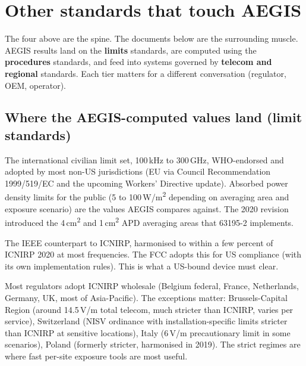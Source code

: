 \documentclass[11pt,a4paper]{article}
\begin{document}
\section{Other standards that touch AEGIS}
The four above are the spine. The documents below are the surrounding muscle. AEGIS results land on the
\textbf{limits} standards, are computed using the \textbf{procedures} standards, and feed into systems
governed by \textbf{telecom and regional} standards. Each tier matters for a different conversation
(regulator, OEM, operator).

\subsection*{Where the AEGIS-computed values land (limit standards)}
\begin{description}[itemsep=0.5em, leftmargin=0pt, labelindent=0pt]
  \item[\textbf{ICNIRP 2020 Guidelines.}]
  The international civilian limit set, 100\,kHz to 300\,GHz, WHO-endorsed and adopted by most non-US
  jurisdictions (EU via Council Recommendation 1999/519/EC and the upcoming Workers' Directive update).
  Absorbed power density limits for the public (5 to 100\,W/m\textsuperscript{2} depending on averaging
  area and exposure scenario) are the values AEGIS compares against. The 2020 revision introduced the
  4\,cm\textsuperscript{2} and 1\,cm\textsuperscript{2} APD averaging areas that 63195-2 implements.

  \item[\textbf{IEEE C95.1-2019} (Safety Levels for Human Exposure to RF, 0\,Hz to 300\,GHz).]
  The IEEE counterpart to ICNIRP, harmonised to within a few percent of ICNIRP 2020 at most
  frequencies. The FCC adopts this for US compliance (with its own implementation rules). This is what a
  US-bound device must clear.

  \item[\textbf{National implementations.}]
  Most regulators adopt ICNIRP wholesale (Belgium federal, France, Netherlands, Germany, UK, most of
  Asia-Pacific). The exceptions matter: Brussels-Capital Region (around 14.5\,V/m total telecom, much
  stricter than ICNIRP, varies per service), Switzerland (NISV ordinance with installation-specific
  limits stricter than ICNIRP at sensitive locations), Italy (6\,V/m precautionary limit in some
  scenarios), Poland (formerly stricter, harmonised in 2019). The strict regimes are where fast per-site
  exposure tools are most useful.
\end{description}
\end{document}
